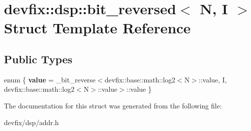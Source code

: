 \hypertarget{structdevfix_1_1dsp_1_1bit__reversed}{}\section{devfix\+:\+:dsp\+:\+:bit\+\_\+reversed$<$ N, I $>$ Struct Template Reference}
\label{structdevfix_1_1dsp_1_1bit__reversed}
\subsection*{Public Types}
\begin{DoxyCompactItemize}
\item 
\mbox{\label{structdevfix_1_1dsp_1_1bit__reversed_a298af374a26bd91170ca57a15676b1ba}} 
enum \{ {\bfseries value} = \+\_\+bit\+\_\+reverse$<$devfix\+:\+:base\+:\+:math\+:\+:log2$<$N$>$\+:\+:value, I, devfix\+:\+:base\+:\+:math\+:\+:log2$<$N$>$\+:\+:value$>$\+:\+:value
 \}
\end{DoxyCompactItemize}


The documentation for this struct was generated from the following file\+:\begin{DoxyCompactItemize}
\item 
devfix/dsp/addr.\+h\end{DoxyCompactItemize}
